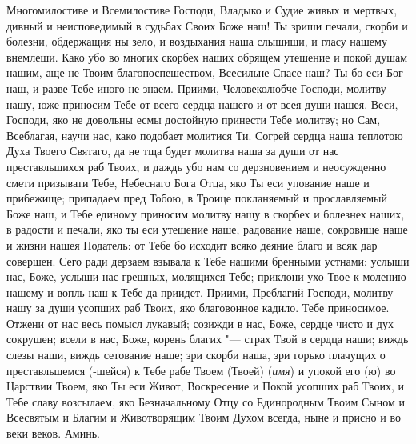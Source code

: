 \begin{mymulticols}
 

\vspace{-\baselineskip}

Многомилостиве и Всемилостиве Господи, Владыко и Судие живых и мертвых, дивный и неисповедимый в судьбах Своих Боже наш! Ты зриши печали, скорби и болезни, обдержащия ны зело, и воздыхания наша слышиши, и гласу нашему внемлеши. Како убо во многих скорбех наших обрящем утешение и покой душам нашим, аще не Твоим благопоспешеством, Всесильне Спасе наш? Ты бо еси Бог наш, и разве Тебе иного не знаем. Приими, Человеколюбче Господи, молитву нашу, юже приносим Тебе от всего сердца нашего и от всея души нашея. Веси, Господи, яко не довольны есмы достойную принести Тебе молитву; но Сам, Всеблагая, научи нас, како подобает молитися Ти. Согрей сердца наша теплотою Духа Твоего Святаго, да не тща будет молитва наша за души от нас преставльшихся раб Твоих, и даждь убо нам со дерзновением и неосужденно смети призывати Тебе, Небеснаго Бога Отца, яко Ты еси упование наше и прибежище; припадаем пред Тобою, в Троице покланяемый и прославляемый Боже наш, и Тебе единому приносим молитву нашу в скорбех и болезнех наших, в радости и печали, яко ты еси утешение наше, радование наше, сокровище наше и жизни нашея Податель: от Тебе бо исходит всяко деяние благо и всяк дар совершен. Сего ради дерзаем взывала к Тебе нашими бренными устнами: услыши нас, Боже, услыши нас грешных, молящихся Тебе; приклони ухо Твое к молению нашему и вопль наш к Тебе да приидет. Приими, Преблагий Господи, молитву нашу за души усопших раб Твоих, яко благовонное кадило. Тебе приносимое. Отжени от нас весь помысл лукавый; созижди в нас, Боже, сердце чисто и дух сокрушен; всели в нас, Боже, корень благих "--- страх Твой в сердца наши; виждь слезы наши, виждь сетование наше; зри скорби наша, зри горько плачущих о преставльшемся (-шейся) к Тебе рабе Твоем (Твоей) ({\itshape имя}) и упокой его (ю) во Царствии Твоем, яко Ты еси Живот, Воскресение и Покой усопших раб Твоих, и Тебе славу возсылаем, яко Безначальному Отцу со Единородным Твоим Сыном и Всесвятым и Благим и Животворящим Твоим Духом всегда, ныне и присно и во веки веков. Аминь. 

\end{mymulticols}

\mychapterending



